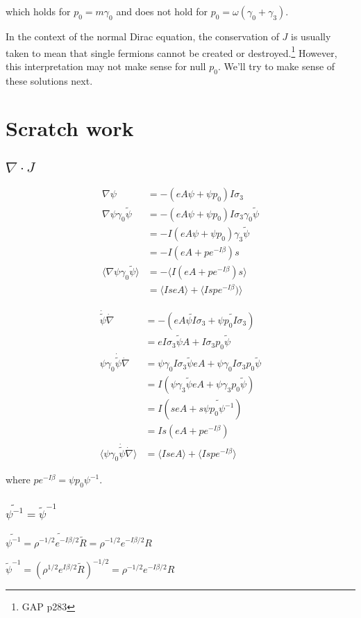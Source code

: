 \documentclass{article}
\begin{document}
  which holds for $p_0 = m \gamma_0$ and does not hold for $p_0 = \omega(\gamma_0 + \gamma_3)$.

  In the context of the normal Dirac equation, the conservation of $J$ is usually taken to mean that single fermions cannot be created or destroyed.\footnote{GAP p283} However, this interpretation may not make sense for null $p_0$. We'll try to make sense of these solutions next.

  \section{Scratch work}

  \subsection{$\nabla \cdot J$}

    \begin{align}
    \nabla \psi &= - (e A \psi + \psi p_0) I \sigma_3 \\
    \nabla \psi \gamma_0 \widetilde \psi &= - (e A \psi + \psi p_0) I \sigma_3 \gamma_0 \widetilde \psi \\
    &= - I (e A \psi + \psi p_0) \gamma_3 \widetilde \psi \\
    &= - I (e A + p e^{-I \beta}) s \\
    \langle \nabla \psi \gamma_0 \widetilde \psi \rangle &= - \langle I (e A + p e^{-I \beta}) s \rangle \\
    &= \langle I s e A \rangle +  \langle I s p e^{-I \beta}) \rangle
  \end{align}

  \begin{align}
    \dot{\widetilde{\psi}} \dot \nabla &= - (e \widetilde{A \psi I \sigma_3} + \widetilde{\psi p_0 I \sigma_3})\\
    &= e I \sigma_3 \widetilde{\psi} A + I \sigma_3 p_0 \widetilde{\psi} \\
    \psi \gamma_0 \dot{\widetilde{\psi}} \dot \nabla &= \psi \gamma_0 I \sigma_3 \widetilde{\psi} e A + \psi \gamma_0 I \sigma_3 p_0 \widetilde{\psi} \\
    &= I (\psi \gamma_3 \widetilde{\psi} e A + \psi \gamma_3 p_0 \widetilde{\psi})\\
    &= I (s e A + s \widetilde{\psi p_0 \psi^{-1}})\\
    &= Is (e A + p e^{-I \beta})\\
    \langle \psi \gamma_0 \dot{\widetilde{\psi}} \dot \nabla \rangle &= \langle I seA \rangle + \langle I s p e^{-I \beta} \rangle
  \end{align}

  where $p e^{-I \beta} = \psi p_0 \psi^{-1}$.

  \subsubsection{$\widetilde{\psi^{-1}} = \widetilde{\psi}^{-1}$}

  $\widetilde{\psi^{-1}} = \widetilde{\rho^{-1/2} e^{-I \beta/2} \widetilde R} = \rho^{-1/2} e^{-I \beta/2} R$

  $\widetilde{\psi}^{-1} = (\rho^{1/2} e^{I \beta/2} \widetilde R)^{-1/2} = \rho^{-1/2} e^{-I \beta/2} R$
\end{document}
